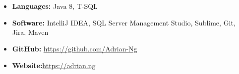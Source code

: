 \documentclass[letterpaper,11pt]{article}
\newcommand{\resumeSubHeadingListStart}{\begin{itemize}[leftmargin=*]}
\newcommand{\resumeSubHeadingListEnd}{\end{itemize}}
\begin{document}
	\section{}
	\resumeSubHeadingListStart
	\item{
		\textbf{Languages:}{\quad\quad\quad
			Java 8, T-SQL}
		\hfill      
	}
	\item{
		\textbf{Software:}{\quad\quad\quad\quad 
			IntelliJ IDEA, SQL Server Management Studio, Sublime, Git, Jira, Maven}
	}
	
	\item{
		\textbf{GitHub:}{\quad\quad\quad\quad\quad
			\href{https://github.com/Adrian-Ng}{https://github.com/Adrian-Ng}}		
	}
	\item{
		\textbf{Website:}{\quad\quad\quad\quad\quad \href{https://adrian.ng}{https://adrian.ng}} 	
	}
	
	\resumeSubHeadingListEnd
	
	
\end{document}
